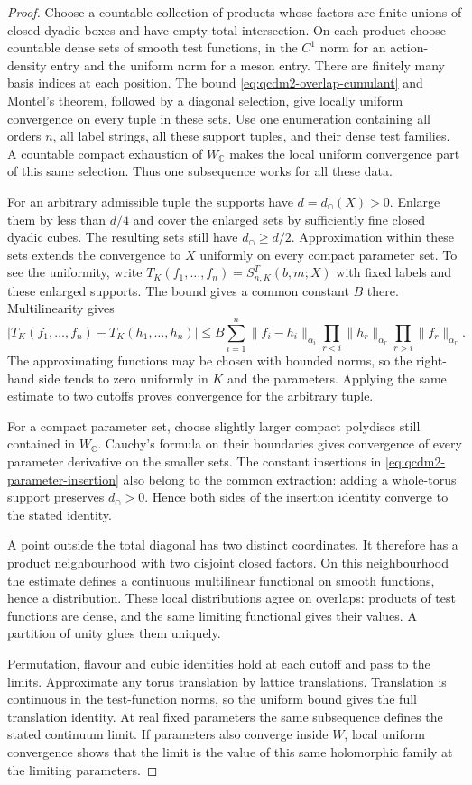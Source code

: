 \documentclass[11pt,letterpaper,reqno]{amsart}
\theoremstyle{definition}
\theoremstyle{remark}
\begin{document}
\begin{proof}
Choose a countable collection of products whose factors are
finite unions of closed dyadic boxes and have empty total
intersection. On each product choose
countable dense sets of smooth test functions, in the $C^1$
norm for an action-density entry and the uniform norm for a
meson entry. There are finitely many basis indices at each
position. The bound \eqref{eq:qcdm2-overlap-cumulant} and
Montel's theorem, followed by a diagonal selection, give
locally uniform convergence on every tuple in these sets.
Use one enumeration containing all orders $n$, all label
strings, all these support tuples, and their dense test
families. A countable compact exhaustion of $W_{\mathbb C}$
makes the local uniform convergence part of this same
selection. Thus one subsequence works for all these data.

For an arbitrary admissible tuple the supports have
$d=d_\cap(X)>0$. Enlarge them by less than $d/4$ and cover
the enlarged sets by sufficiently fine closed dyadic cubes.
The resulting sets still have $d_\cap\ge d/2$. Approximation
within these sets extends the convergence to $X$ uniformly
on every compact parameter set. To see the uniformity,
write $T_K(f_1,\ldots,f_n)=S^T_{n,K}(b,m;X)$ with fixed
labels and these enlarged supports. The bound gives a
common constant $B$ there. Multilinearity gives
\[
 |T_K(f_1,\ldots,f_n)-T_K(h_1,\ldots,h_n)|
 \le B\sum_{i=1}^n\|f_i-h_i\|_{\alpha_i}
       \prod_{r<i}\|h_r\|_{\alpha_r}
       \prod_{r>i}\|f_r\|_{\alpha_r}.
\]
The approximating functions may be chosen with bounded
norms, so the right-hand side tends to zero uniformly
in $K$ and the parameters. Applying the same estimate
to two cutoffs proves convergence for the arbitrary tuple.

For a compact parameter set, choose slightly larger compact
polydiscs still contained in $W_{\mathbb C}$. Cauchy's
formula on their boundaries gives convergence of every
parameter derivative on the smaller sets. The constant
insertions in \eqref{eq:qcdm2-parameter-insertion} also
belong to the common extraction: adding a whole-torus
support preserves $d_\cap>0$. Hence both sides of the
insertion identity converge to the stated identity.

A point outside the total diagonal has two distinct
coordinates. It therefore has a product neighbourhood with
two disjoint closed factors. On this neighbourhood the
estimate defines a continuous multilinear functional on
smooth functions, hence a distribution. These local
distributions agree on overlaps: products of test functions
are dense, and the same limiting functional gives their
values. A partition of unity glues them uniquely.

Permutation, flavour and cubic identities hold at each cutoff
and pass to the limits. Approximate any torus translation by
lattice translations. Translation is continuous in the
test-function norms, so the uniform bound gives the full
translation identity. At real fixed parameters the same
subsequence defines the stated continuum limit. If parameters
also converge inside $W$, local uniform convergence shows that
the limit is the value of this same holomorphic family at the
limiting parameters.
\end{proof}
\end{document}
